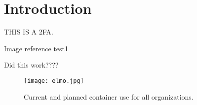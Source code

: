 \section{Introduction}
\label{sec:intro}

\lipsum[1] THIS IS A \ac{2FA}\cite{Kane2018-fn}.

Image reference test\ref{fig:containers_usage_2020}

Did this work????
\begin{figure}[!htb]
    \centering
    \texttt{[image: elmo.jpg]}
    \caption{Current and planned container use for all organizations.}
    \label{fig:containers_usage_2020}
\end{figure}
